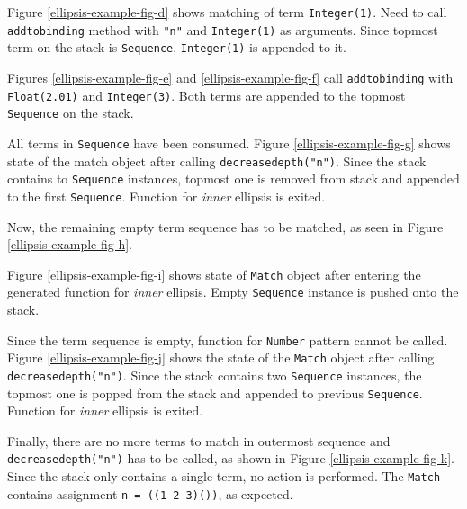 Figure \ref{ellipsis-example-fig-d} shows matching of term \texttt{Integer(1)}. Need to call \texttt{addtobinding} method with \texttt{"n"} and \texttt{Integer(1)} as arguments. Since topmost term on the stack is \texttt{Sequence}, \texttt{Integer(1)} is appended to it.

Figures \ref{ellipsis-example-fig-e} and \ref{ellipsis-example-fig-f} call \texttt{addtobinding} with \texttt{Float(2.01)} and \texttt{Integer(3)}. Both terms are appended to the topmost \texttt{Sequence} on the stack.

All terms in \texttt{Sequence} have been consumed. Figure \ref{ellipsis-example-fig-g} shows state of the match object after calling \texttt{decreasedepth("n")}. Since the stack contains to \texttt{Sequence} instances, topmost one is removed from stack and appended to the first \texttt{Sequence}. Function for \textit{inner} ellipsis is exited.

Now, the remaining empty term sequence has to be matched, as seen in Figure \ref{ellipsis-example-fig-h}.

Figure \ref{ellipsis-example-fig-i} shows state of \texttt{Match} object after entering the generated function for \textit{inner} ellipsis. Empty \texttt{Sequence} instance is pushed onto the stack.

Since the term sequence is empty, function for \texttt{Number} pattern cannot be called. Figure \ref{ellipsis-example-fig-j} shows the state of the \texttt{Match} object after calling \texttt{decreasedepth("n")}. Since the stack contains two \texttt{Sequence} instances, the topmost one is popped from the stack and appended to previous \texttt{Sequence}. Function for \textit{inner} ellipsis is exited.

Finally, there are no more terms to match in outermost sequence and \texttt{decreasedepth("n")} has to be called, as shown in Figure \ref{ellipsis-example-fig-k}. Since the stack only contains a single term, no action is performed. The \texttt{Match} contains assignment \texttt{n = ((1 2 3)())}, as expected.

